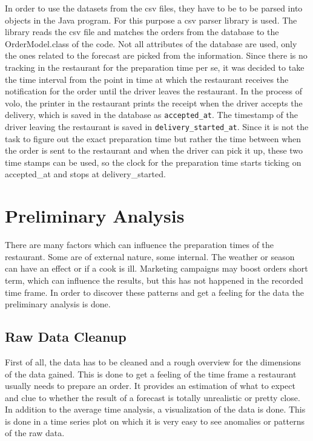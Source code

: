 In order to use the datasets from the csv files, they have to be to be parsed into objects in the Java program. For this purpose a csv parser library is used. The library reads the csv file and matches the orders from the database to the OrderModel.class of the code. Not all attributes of the database are used, only the ones related to the forecast are picked from the information. Since there is no tracking in the restaurant for the preparation time per se, it was decided to take the time interval from the point in time at which the restaurant receives the notification for the order until the driver leaves the restaurant. In the process of volo, the printer in the restaurant prints the receipt when the driver accepts the delivery, which is saved in the database as \texttt{accepted\_at}. The timestamp of the driver leaving the restaurant is saved in \texttt{delivery\_started\_at}. Since it is not the task to figure out the exact preparation time but rather the time between when the order is sent to the restaurant and when the driver can pick it up,  these two time stamps can be used, so the clock for the preparation time starts ticking on accepted_at and stops at delivery_started.
\section{Preliminary Analysis}\label{section:Preliminary Analysis}
There are many factors which can influence the preparation times of the restaurant. Some are of external nature, some internal. The weather or season can have an effect or if a cook is ill.\newline
Marketing campaigns may boost orders short term, which can influence the results, but this has not happened in the recorded time frame.\newline
In order to discover these patterns and get a feeling for the data the preliminary analysis is done.
\subsection{Raw Data Cleanup}\label{subsection:Raw Data Cleanup}
First of all, the data has to be cleaned and a rough overview for the dimensions of the data gained. This is done to get a feeling of the time frame a restaurant usually needs to prepare an order. It provides an estimation of what to expect and clue to whether the result of a forecast is totally unrealistic or pretty close. In addition to the average time analysis, a visualization of the data is done. This is done in a time series plot on which it is very easy to see anomalies or patterns of the raw data.\newline

